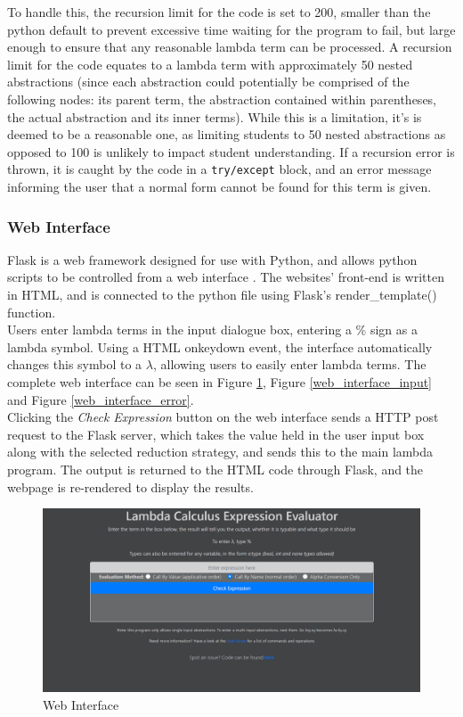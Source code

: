 \documentclass[a4paper,11pt]{report}
\begin{document}
To handle this, the recursion limit for the code is set to 200, smaller than the python default to prevent excessive time waiting for the program to fail, but large enough to ensure that any reasonable lambda term can be processed. A recursion limit for the code equates to a lambda term with approximately 50 nested abstractions (since each abstraction could potentially be comprised of the following nodes: its parent term, the abstraction contained within parentheses, the actual abstraction and its inner terms). While this is a limitation, it's is deemed to be a reasonable one, as limiting students to 50 nested abstractions as opposed to 100 is unlikely to impact student understanding. If a recursion error is thrown, it is caught by the code in a \texttt{try/except} block, and an error message informing the user that a normal form cannot be found for this term is given.

\subsubsection{Web Interface}

Flask is a web framework designed for use with Python, and allows python scripts to be controlled from a web interface \cite{FullStack2019}. The websites' front-end is written in HTML, and is connected to the python file using Flask's render_template() function.\\

Users enter lambda terms in the input dialogue box, entering a \% sign as a lambda symbol. Using a HTML onkeydown event, the interface automatically changes this symbol to a $\lambda$, allowing users to easily enter lambda terms. The complete web interface can be seen in Figure \ref{web_interface_no_input}, Figure \ref{web_interface_input} and Figure \ref{web_interface_error}.\\

Clicking the \textit{Check Expression} button on the web interface sends a HTTP post request to the Flask server, which takes the value held in the user input box along with the selected reduction strategy, and sends this to the main lambda program. The output is returned to the HTML code through Flask, and the webpage is re-rendered to display the results.

\begin{figure}[p]
	\includegraphics[scale=0.4]{images/web_interface_no_input}
	\centering
	\caption{Web Interface}
	\label{web_interface_no_input}
\end{figure}
\end{document}
